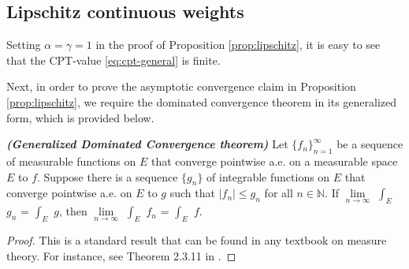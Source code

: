 \subsection{Lipschitz continuous weights}
\label{sec:lipschitz-proofs}
 Setting $\alpha=\gamma=1$ in the proof of Proposition \ref{prop:lipschitz}, it is easy to see that the CPT-value \eqref{eq:cpt-general} is finite. 

Next, in order to prove the asymptotic convergence claim in Proposition \ref{prop:lipschitz}, we require the dominated convergence theorem in its generalized form, which is provided below.
\begin{theorem}{\textbf{\textit{(Generalized Dominated Convergence theorem)}}}
Let $\{f_n\}_{n=1}^\infty$ be a sequence of measurable functions on $E$ that converge pointwise a.e. on a measurable space $E$ to $f$.  Suppose there is a sequence $\{g_n\}$ of integrable functions on $E$ that converge pointwise a.e. on $E$ to $g$ such that $|f_n| \leq g_n$ for all $n \in \mathbb{N}$.  
If $\lim\limits_{n \rightarrow \infty}$ $\int_E$ $g_n$ = $\int_E$ $g$, then $\lim\limits_{n \rightarrow \infty}$ $\int_E$ $f_n$ = $\int_E$ $f$.
\end{theorem}


\begin{proof}
This is a standard result that can be found in any textbook on measure theory. For instance, see Theorem 2.3.11 in \cite{athreya2006measure}.
\end{proof}


